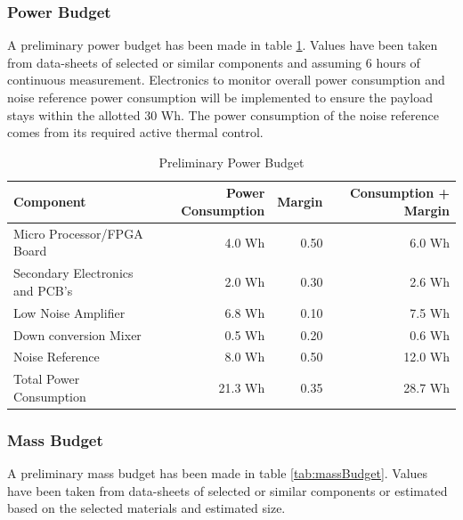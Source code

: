 \documentclass[12pt]{article}
\begin{document}
\subsubsection{Power Budget}

A preliminary power budget has been made in table \ref{tab:powerBudget}. Values have been taken from data-sheets of selected or similar components and assuming 6 hours of continuous measurement. Electronics to monitor overall power consumption and noise reference power consumption will be implemented to ensure the payload stays within the allotted 30 Wh. The power consumption of the noise reference comes from its required active thermal control. 

\begin{table}[H]
	\centering
	\vspace{0.5cm}
	\renewcommand{\arraystretch}{1.3}
	\caption{Preliminary Power Budget}
	\label{tab:powerBudget}
	\begin{tabularx}{\textwidth}{lrrr}
		\toprule
		Component & Power Consumption & Margin & Consumption + Margin \\		
		\midrule
		Micro Processor/FPGA Board			& 4.0 Wh  & 0.50  &  6.0 Wh \\ 
		Secondary Electronics and PCB's		& 2.0 Wh  & 0.30  &  2.6 Wh \\
		Low Noise Amplifier					& 6.8 Wh  & 0.10  &  7.5 Wh \\ 
		Down conversion Mixer				& 0.5 Wh  & 0.20  &  0.6 Wh \\ 
		Noise Reference						& 8.0 Wh  & 0.50  & 12.0 Wh \\ \midrule
		Total Power Consumption				&21.3 Wh  & 0.35  & 28.7 Wh
	\end{tabularx}	
\end{table}

\subsubsection{Mass Budget}

A preliminary mass budget has been made in table \ref{tab:massBudget}. Values have been taken from data-sheets of selected or similar components or estimated based on the selected materials and estimated size. 
\end{document}
